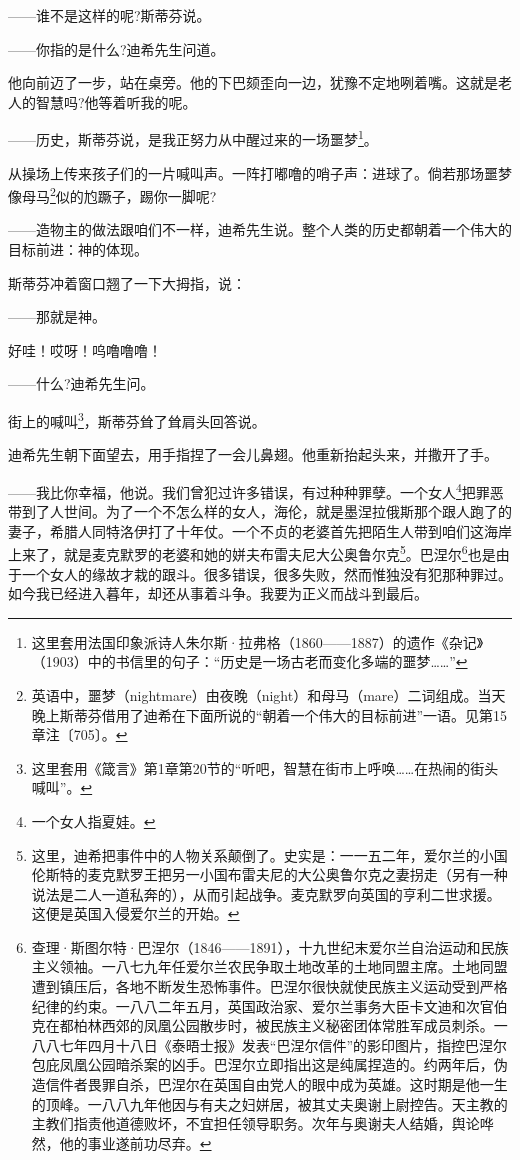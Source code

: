 \par ——谁不是这样的呢?斯蒂芬说。
\par ——你指的是什么?迪希先生问道。
\par 他向前迈了一步，站在桌旁。他的下巴颏歪向一边，犹豫不定地咧着嘴。这就是老人的智慧吗?他等着听我的呢。
\par ——历史，斯蒂芬说，是我正努力从中醒过来的一场噩梦\footnote{这里套用法国印象派诗人朱尔斯·拉弗格（1860——1887）的遗作《杂记》（1903）中的书信里的句子：“历史是一场古老而变化多端的噩梦……”}。
\par 从操场上传来孩子们的一片喊叫声。一阵打嘟噜的哨子声：进球了。倘若那场噩梦像母马\footnote{英语中，噩梦（nightmare）由夜晚（night）和母马（mare）二词组成。当天晚上斯蒂芬借用了迪希在下面所说的“朝着一个伟大的目标前进”一语。见第15章注〔705〕。}似的尥蹶子，踢你一脚呢?
\par ——造物主的做法跟咱们不一样，迪希先生说。整个人类的历史都朝着一个伟大的目标前进：神的体现。
\par 斯蒂芬冲着窗口翘了一下大拇指，说：
\par ——那就是神。
\par 好哇！哎呀！呜噜噜噜！
\par ——什么?迪希先生问。
\par 街上的喊叫\footnote{这里套用《箴言》第1章第20节的“听吧，智慧在街市上呼唤……在热闹的街头喊叫”。}，斯蒂芬耸了耸肩头回答说。
\par 迪希先生朝下面望去，用手指捏了一会儿鼻翅。他重新抬起头来，并撒开了手。
\par ——我比你幸福，他说。我们曾犯过许多错误，有过种种罪孽。一个女人\footnote{一个女人指夏娃。}把罪恶带到了人世间。为了一个不怎么样的女人，海伦，就是墨涅拉俄斯那个跟人跑了的妻子，希腊人同特洛伊打了十年仗。一个不贞的老婆首先把陌生人带到咱们这海岸上来了，就是麦克默罗的老婆和她的姘夫布雷夫尼大公奥鲁尔克\footnote{这里，迪希把事件中的人物关系颠倒了。史实是：一一五二年，爱尔兰的小国伦斯特的麦克默罗王把另一小国布雷夫尼的大公奥鲁尔克之妻拐走（另有一种说法是二人一道私奔的），从而引起战争。麦克默罗向英国的亨利二世求援。这便是英国入侵爱尔兰的开始。}。巴涅尔\footnote{查理·斯图尔特·巴涅尔（1846——1891），十九世纪末爱尔兰自治运动和民族主义领袖。一八七九年任爱尔兰农民争取土地改革的土地同盟主席。土地同盟遭到镇压后，各地不断发生恐怖事件。巴涅尔很快就使民族主义运动受到严格纪律的约束。一八八二年五月，英国政治家、爱尔兰事务大臣卡文迪和次官伯克在都柏林西郊的凤凰公园散步时，被民族主义秘密团体常胜军成员刺杀。一八八七年四月十八日《泰晤士报》发表“巴涅尔信件”的影印图片，指控巴涅尔包庇凤凰公园暗杀案的凶手。巴涅尔立即指出这是纯属捏造的。约两年后，伪造信件者畏罪自杀，巴涅尔在英国自由党人的眼中成为英雄。这时期是他一生的顶峰。一八八九年他因与有夫之妇姘居，被其丈夫奥谢上尉控告。天主教的主教们指责他道德败坏，不宜担任领导职务。次年与奥谢夫人结婚，舆论哗然，他的事业遂前功尽弃。}也是由于一个女人的缘故才栽的跟斗。很多错误，很多失败，然而惟独没有犯那种罪过。如今我已经进入暮年，却还从事着斗争。我要为正义而战斗到最后。
